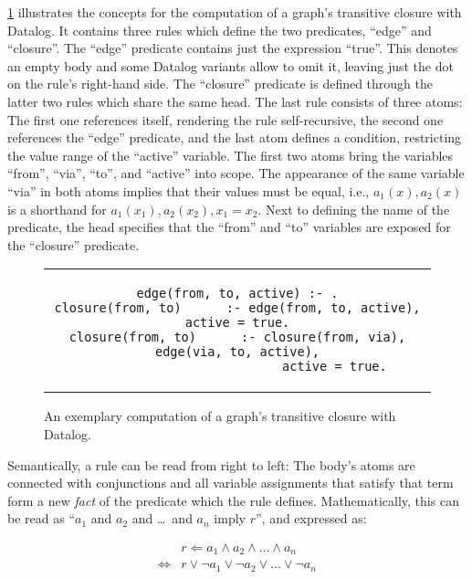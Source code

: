 \ref{code:trans-closure-datalog} illustrates the concepts for the
computation of a graph's transitive closure with Datalog.
It contains three rules which define the two predicates, ``edge'' and ``closure''.
The ``edge'' predicate contains just the expression ``true''.
This denotes an empty body and some Datalog variants allow to omit it,
leaving just the dot on the rule's right-hand side.
The ``closure'' predicate is defined through the latter two rules which share
the same head.
The last rule consists of three atoms: The first one references itself, rendering
the rule self-recursive, the second one references the ``edge'' predicate,
and the last atom defines a condition, restricting the value range of the
``active'' variable.
The first two atoms bring the variables ``from'', ``via'', ``to'', and ``active''
into scope.
The appearance of the same variable ``via'' in both atoms implies that their
values must be equal, i.e.,
\(a_1(x), a_2(x)\) is a shorthand for \(a_1(x_1), a_2(x_2), x_1 = x_2\).
Next to defining the name of the predicate, the head specifies that the ``from''
and ``to'' variables are exposed for the ``closure'' predicate.

\begin{figure}[htpb]
	\centering
	\begin{tabular}{c}
		\begin{lstlisting}[keepspaces]
edge(from, to, active) :- .
closure(from, to)      :- edge(from, to, active), active = true.
closure(from, to)      :- closure(from, via), edge(via, to, active),
                          active = true.\end{lstlisting}
	\end{tabular}
	\caption{An exemplary computation of a graph's transitive closure with Datalog.}\label{code:trans-closure-datalog}
\end{figure}

Semantically, a rule can be read from right to left: The body's atoms are
connected with conjunctions and all variable assignments that satisfy that term
form a new \emph{fact} of the predicate which the rule defines.
Mathematically, this can be read as
``$a_1$ and $a_2$ and \ldots\ and $a_n$ imply $r$'', and expressed as:

\begin{equation}
	\begin{aligned}
		                & r \Leftarrow a_1 \land a_2 \land \ldots \land a_n          \\
		\Leftrightarrow & r \lor \lnot a_1 \lor \lnot a_2 \lor \ldots \lor \lnot a_n
	\end{aligned}
\end{equation}

